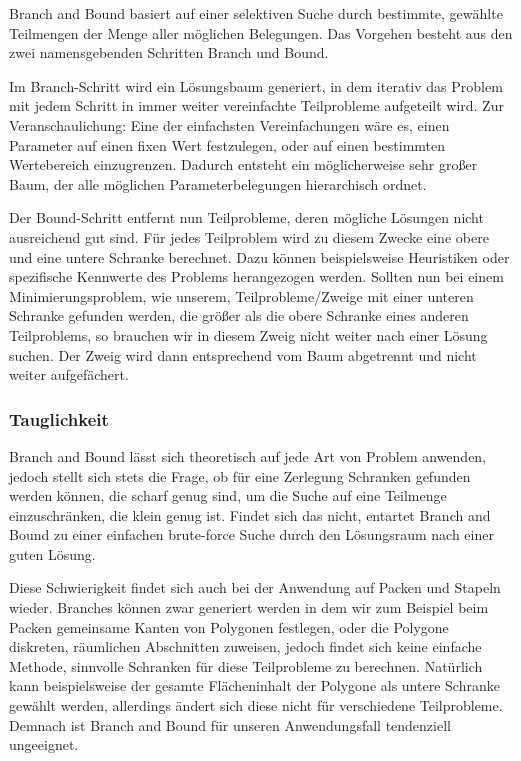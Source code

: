 \documentclass[runningheads,a4paper]{llncs}
\begin{document}
Branch and Bound basiert auf einer selektiven Suche durch bestimmte, gewählte Teilmengen der Menge aller möglichen Belegungen. Das Vorgehen besteht aus den zwei namensgebenden Schritten Branch und Bound.

Im Branch-Schritt wird ein Lösungsbaum generiert, in dem iterativ das Problem mit jedem Schritt in immer weiter vereinfachte Teilprobleme aufgeteilt wird. Zur Veranschaulichung: Eine der einfachsten Vereinfachungen wäre es, einen Parameter auf einen fixen Wert festzulegen, oder auf einen bestimmten Wertebereich einzugrenzen. 
Dadurch entsteht ein möglicherweise sehr großer Baum, der alle möglichen Parameterbelegungen hierarchisch ordnet.

Der Bound-Schritt entfernt nun Teilprobleme, deren mögliche Lösungen nicht ausreichend gut sind. Für jedes Teilproblem wird zu diesem Zwecke eine obere und eine untere Schranke berechnet. Dazu können beispielsweise Heuristiken oder spezifische Kennwerte des Problems herangezogen werden.
Sollten nun bei einem Minimierungsproblem, wie unserem, Teilprobleme/Zweige mit einer unteren Schranke gefunden werden, die größer als die obere Schranke eines anderen Teilproblems, so brauchen wir in diesem Zweig nicht weiter nach einer Lösung suchen. Der Zweig wird dann entsprechend vom Baum abgetrennt und nicht weiter aufgefächert.

\subsubsection{Tauglichkeit}

Branch and Bound lässt sich theoretisch auf jede Art von Problem anwenden, jedoch stellt sich stets die Frage, ob für eine Zerlegung Schranken gefunden werden können, die scharf genug sind, um die Suche auf eine Teilmenge einzuschränken, die klein genug ist. 
Findet sich das nicht, entartet Branch and Bound zu einer einfachen brute-force Suche durch den Lösungsraum nach einer guten Lösung.

Diese Schwierigkeit findet sich auch bei der Anwendung auf Packen und Stapeln wieder. Branches können zwar generiert werden in dem wir zum Beispiel beim Packen gemeinsame Kanten von Polygonen festlegen, oder die Polygone diskreten, räumlichen Abschnitten zuweisen, jedoch findet sich keine einfache Methode, sinnvolle Schranken für diese Teilprobleme zu berechnen. Natürlich kann beispielsweise der gesamte Flächeninhalt der Polygone als untere Schranke gewählt werden, allerdings ändert sich diese nicht für verschiedene Teilprobleme. Demnach ist Branch and Bound für unseren Anwendungsfall tendenziell ungeeignet.
\end{document}
